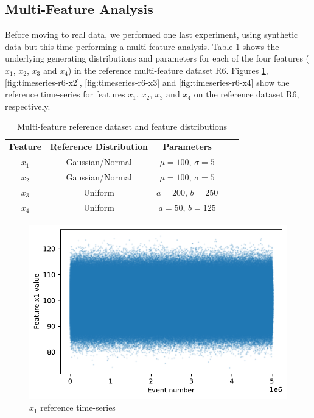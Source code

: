 \documentclass[sigconf]{acmart}
\begin{document}
\subsection{Multi-Feature Analysis}
Before moving to real data, we performed one last experiment, using synthetic data but this time performing a multi-feature analysis. Table \ref{tbl:multi-feat-ref-dataset-distros} shows the underlying generating distributions and parameters for each of the four features ($x_1$, $x_2$, $x_3$ and $x_4$) in the reference multi-feature dataset R6. Figures \ref{fig:timeseries-r6-x1}, \ref{fig:timeseries-r6-x2}, \ref{fig:timeseries-r6-x3} and \ref{fig:timeseries-r6-x4} show the reference time-series for features $x_1$, $x_2$, $x_3$ and $x_4$ on the reference dataset R6, respectively.
\begin{table}[!htb]
    \begin{center}
        \begin{tabular}{|c|c|c|ll}
        \cline{1-3}
        \textbf{Feature} & \textbf{Reference Distribution} & \textbf{Parameters} &  &  \\ \cline{1-3}
        $x_1$               & Gaussian/Normal                 & $\mu=100$, $\sigma=5$  &  &  \\ \cline{1-3}
        $x_2$               & Gaussian/Normal                 & $\mu=100$, $\sigma=5$  &  &  \\ \cline{1-3}
        $x_3$               & Uniform                         & $a=200$, $b=250$       &  &  \\ \cline{1-3}
        $x_4$               & Uniform                         & $a=50$, $b=125$        &  &  \\ \cline{1-3}
        \end{tabular}
    \end{center}
    \caption{Multi-feature reference dataset and feature distributions}
    \label{tbl:multi-feat-ref-dataset-distros}
\end{table}
\begin{figure}[!htb]
    \begin{center}
      \includegraphics[scale=0.5]{figures/timeseries-r6-x1.pdf} 
      \caption{$x_1$ reference time-series} 
      \label{fig:timeseries-r6-x1} 
    \end{center}
\end{figure}
\end{document}
